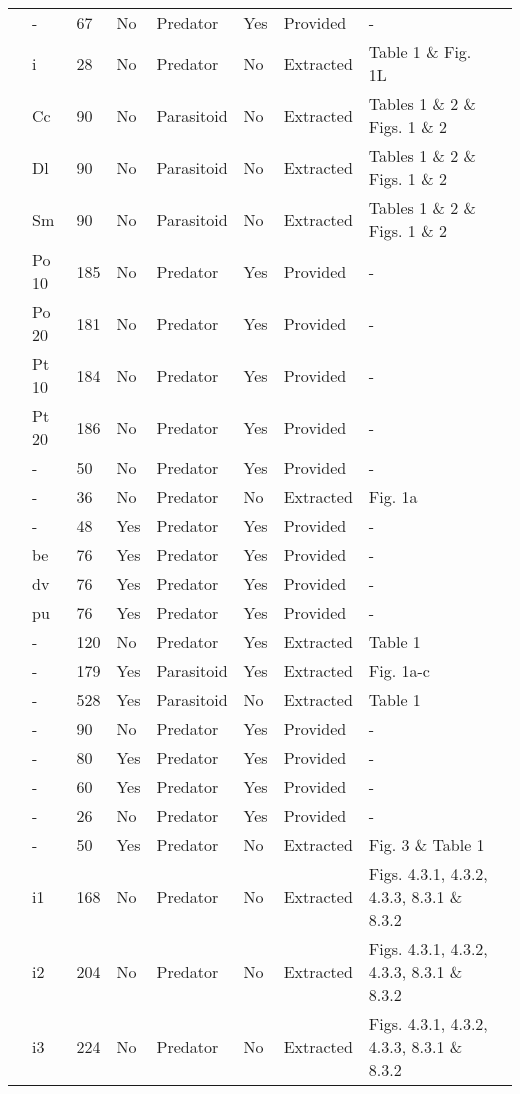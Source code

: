 \begin{longtable}{lllllllll}
\citet{Kratina:2009aa}&-&67&No&Predator&Yes&Provided&-&\citet{Kratina:2020aa}\tabularnewline
\citet{Krylov:1992aa}&i&28&No&Predator&No&Extracted&Table 1 \& Fig. 1L&\citet{Novak:2020aa}\tabularnewline
\citet{Kumar:1985aa}&Cc&90&No&Parasitoid&No&Extracted&Tables 1 \& 2 \& Figs. 1 \& 2&\citet{Novak:2020aa}\tabularnewline
\citet{Kumar:1985aa}&Dl&90&No&Parasitoid&No&Extracted&Tables 1 \& 2 \& Figs. 1 \& 2&\citet{Novak:2020aa}\tabularnewline
\citet{Kumar:1985aa}&Sm&90&No&Parasitoid&No&Extracted&Tables 1 \& 2 \& Figs. 1 \& 2&\citet{Novak:2020aa}\tabularnewline
\citet{Lang:2012aa}&Po 10&185&No&Predator&Yes&Provided&-&\citet{Lang:2020aa}\tabularnewline
\citet{Lang:2012aa}&Po 20&181&No&Predator&Yes&Provided&-&\citet{Lang:2020aa}\tabularnewline
\citet{Lang:2012aa}&Pt 10&184&No&Predator&Yes&Provided&-&\citet{Lang:2020aa}\tabularnewline
\citet{Lang:2012aa}&Pt 20&186&No&Predator&Yes&Provided&-&\citet{Lang:2020aa}\tabularnewline
\citet{Long:2012aa}&-&50&No&Predator&Yes&Provided&-&\citet{Long:2020aa}\tabularnewline
\citet{Mansour:1991aa}&-&36&No&Predator&No&Extracted&Fig. 1a&\citet{Novak:2020aa}\tabularnewline
\citet{Medoc:2013aa}&-&48&Yes&Predator&Yes&Provided&-&\citet{Medoc:2020aa}\tabularnewline
\citet{Medoc:2015aa}&be&76&Yes&Predator&Yes&Provided&-&\citet{Medoc:2020ab}\tabularnewline
\citet{Medoc:2015aa}&dv&76&Yes&Predator&Yes&Provided&-&\citet{Medoc:2020ab}\tabularnewline
\citet{Medoc:2015aa}&pu&76&Yes&Predator&Yes&Provided&-&\citet{Medoc:2020ab}\tabularnewline
\citet{Mertz:1968aa}&-&120&No&Predator&Yes&Extracted&Table 1&\citet{Novak:2020aa}\tabularnewline
\citet{Mills:2004aa}&-&179&Yes&Parasitoid&Yes&Extracted&Fig. 1a-c&\citet{Novak:2020aa}\tabularnewline
\citet{Montoya:2000aa}&-&528&Yes&Parasitoid&No&Extracted&Table 1&\citet{Novak:2020aa}\tabularnewline
\citet{Omkar:2004aa}&-&90&No&Predator&Yes&Provided&-&\citet{Omkar:2004aa}\tabularnewline
\citet{Prokopenko:2017aa}&-&80&Yes&Predator&Yes&Provided&-&\citet{Prokopenko:2020aa}\tabularnewline
\citet{Pusack:2018aa}&-&60&Yes&Predator&Yes&Provided&-&\citet{Pusack:2020aa}\tabularnewline
\citet{Reeve:1997aa}&-&26&No&Predator&Yes&Provided&-&\citet{Reeve:2020aa}\tabularnewline
\citet{Salt:1974aa}&-&50&Yes&Predator&No&Extracted&Fig. 3 \& Table 1&\citet{Novak:2020aa}\tabularnewline
\citet{Uttley:1980aa}&i1&168&No&Predator&No&Extracted&Figs. 4.3.1, 4.3.2, 4.3.3, 8.3.1 \& 8.3.2&\citet{Novak:2020aa}\tabularnewline
\citet{Uttley:1980aa}&i2&204&No&Predator&No&Extracted&Figs. 4.3.1, 4.3.2, 4.3.3, 8.3.1 \& 8.3.2&\citet{Novak:2020aa}\tabularnewline
\citet{Uttley:1980aa}&i3&224&No&Predator&No&Extracted&Figs. 4.3.1, 4.3.2, 4.3.3, 8.3.1 \& 8.3.2&\citet{Novak:2020aa}\tabularnewline

\end{longtable}
